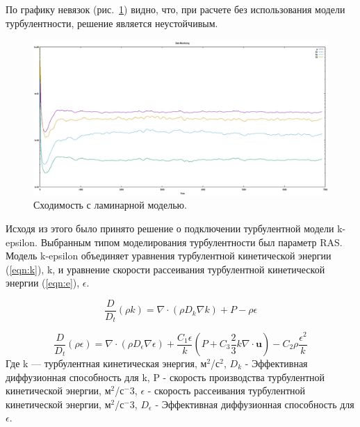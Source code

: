 \documentclass[14pt,a4paper]{article}
\begin{document}
       По графику невязок (рис.~\ref{fig:DRLam}) видно, что, при расчете без использования модели турбулентности, решение является неустойчивым. 
        
        \begin{figure}[H]
            \centering
            \includegraphics[width = 1\linewidth]{dataMonitoringLaminar}
            \caption{Сходимость с ламинарной моделью.}
            \label{fig:DRLam}
        \end{figure}
        
        
        Исходя из этого было принято решение о подключении турбулентной модели k-epsilon. Выбранным типом моделирования турбулентности был параметр RAS. Модель k-epsilon объединяет уравнения турбулентной кинетической энергии (\ref{eqn:k}), k, и уравнение скорости рассеивания турбулентной кинетической энергии (\ref{eqn:e}), $\epsilon$.
        
        \begin{equation}\label{eqn:k}
            \frac{D}{D_{t}}(\rho k) = \nabla \cdot (\rho D_{k}\nabla k) + P - \rho\epsilon
        \end{equation} 
        
        \begin{equation}\label{eqn:e}
            \frac{D}{D_{t}}(\rho\epsilon) = \nabla \cdot (\rho D_{\epsilon}\nabla\epsilon) + \frac{C_{1}\epsilon}{k}(P + C_{3}\frac{2}{3}k\nabla \cdot \bm{u}) - C_{2}\rho\frac{\epsilon^2}{k}
        \end{equation} 
       Где k --- турбулентная кинетическая энергия, м$^2$/с$^2$, $D_{k}$ - Эффективная диффузионная способность для k, P - скорость производства турбулентной кинетической энергии, м$^2$/с$^-3$, $\epsilon$ - скорость рассеивания турбулентной кинетической энергии, м$^2$/с$^-3$, $D_{\epsilon}$ - Эффективная диффузионная способность для $\epsilon$.
               
\end{document}
